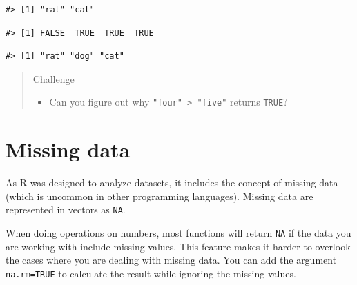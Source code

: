\documentclass[]{book}
\newenvironment{Shaded}{\begin{snugshade}}{\end{snugshade}}
\newcommand{\KeywordTok}[1]{\textcolor[rgb]{0.13,0.29,0.53}{\textbf{#1}}}
\newcommand{\StringTok}[1]{\textcolor[rgb]{0.31,0.60,0.02}{#1}}
\newcommand{\OperatorTok}[1]{\textcolor[rgb]{0.81,0.36,0.00}{\textbf{#1}}}
\newcommand{\NormalTok}[1]{#1}
\providecommand{\tightlist}{%
  \setlength{\itemsep}{0pt}\setlength{\parskip}{0pt}}
\theoremstyle{definition}
\theoremstyle{definition}
\theoremstyle{remark}
\begin{document}
\begin{verbatim}
#> [1] "rat" "cat"
\end{verbatim}

\begin{Shaded}
\end{Shaded}

\begin{verbatim}
#> [1] FALSE  TRUE  TRUE  TRUE
\end{verbatim}

\begin{Shaded}
\end{Shaded}

\begin{verbatim}
#> [1] "rat" "dog" "cat"
\end{verbatim}

\begin{quote}
Challenge

\begin{itemize}
\tightlist
\item
  Can you figure out why \texttt{"four"\ \textgreater{}\ "five"} returns
  \texttt{TRUE}?
\end{itemize}
\end{quote}

\section{Missing data}\label{missing-data}

As R was designed to analyze datasets, it includes the concept of
missing data (which is uncommon in other programming languages). Missing
data are represented in vectors as \texttt{NA}.

When doing operations on numbers, most functions will return \texttt{NA}
if the data you are working with include missing values. This feature
makes it harder to overlook the cases where you are dealing with missing
data. You can add the argument \texttt{na.rm=TRUE} to calculate the
result while ignoring the missing values.
\end{document}
